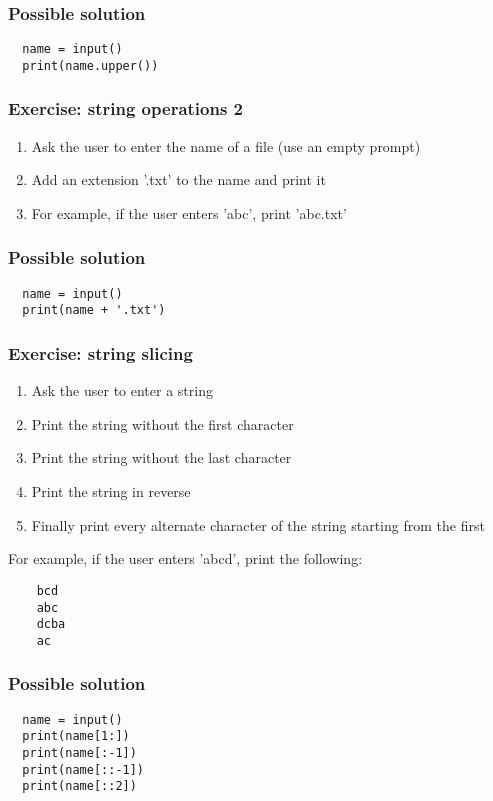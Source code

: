 \documentclass[14pt,compress]{beamer}
\begin{document}
\begin{frame}
\frametitle{Possible solution}
\begin{lstlisting}
  name = input()
  print(name.upper())
\end{lstlisting}
\end{frame}

\begin{frame}[plain]
  \frametitle{Exercise: string operations 2}
  \begin{enumerate}
  \item Ask the user to enter the name of a file (use an empty prompt)
  \item Add an extension '.txt' to the name and print it
  \item For example, if the user enters 'abc', print 'abc.txt'
  \end{enumerate}
\end{frame}

\begin{frame}
\frametitle{Possible solution}
\begin{lstlisting}
  name = input()
  print(name + '.txt')
\end{lstlisting}

\end{frame}


\begin{frame}
  \frametitle{Exercise: string slicing}
  \begin{enumerate}
  \item Ask the user to enter a string
  \item Print the string without the first character
  \item Print the string without the last character
  \item Print the string in reverse
  \item Finally print every alternate character of the string starting from
    the first
  \end{enumerate}
  For example, if the user enters 'abcd', print the following:
  \begin{lstlisting}
    bcd
    abc
    dcba
    ac
  \end{lstlisting}
\end{frame}

\begin{frame}
\frametitle{Possible solution}
\begin{lstlisting}
  name = input()
  print(name[1:])
  print(name[:-1])
  print(name[::-1])
  print(name[::2])
\end{lstlisting}

\end{frame}
\end{document}
